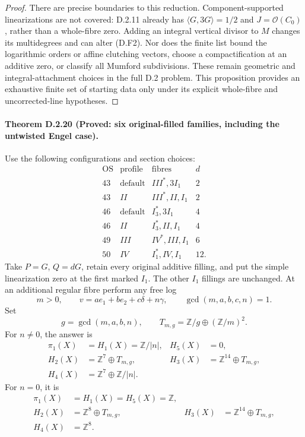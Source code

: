 \begin{proof}
There are precise boundaries to this reduction.
Component-supported linearizations are not covered:
D.2.11 already has $\langle G,3G\rangle=1/2$ and
$J=\mathcal O(C_0)$, rather than a whole-fibre zero.
Adding an integral vertical divisor to $M$ changes its
multidegrees and can alter (D.F2).
Nor does the finite list bound the logarithmic orders
or affine clutching vectors, choose a compactification
at an additive zero, or classify all Mumford subdivisions.
These remain geometric and integral-attachment choices
in the full D.2 problem. This proposition provides an
exhaustive finite set of starting data only under its
explicit whole-fibre and uncorrected-line hypotheses.
\end{proof}

\paragraph{Theorem D.2.20 (Proved: six original-filled families, including the untwisted Engel case).}
Use the following configurations and section choices:
\[
\begin{array}{c|c|l|r}
 \mathrm{OS}&\mathrm{profile}&\text{fibres}&d\\\hline
 43&\mathrm{default}&III^*,3I_1&2\\
 43&II&III^*,II,I_1&2\\
 46&\mathrm{default}&I_3^*,3I_1&4\\
 46&II&I_3^*,II,I_1&4\\
 49&III&IV^*,III,I_1&6\\
 50&IV&I_1^*,IV,I_1&12.
\end{array}
\]
Take $P=G$, $Q=dG$, retain every original additive filling,
and put the simple linearization zero at the first marked
$I_1$. The other $I_1$ fillings are unchanged. At an
additional regular fibre perform any free log
\[
 m>0,\qquad v=a e_1+b e_2+c\delta+n\gamma,
 \qquad\gcd(m,a,b,c,n)=1.
\]
Set
\[
        g=\gcd(m,a,b,n),\qquad
        T_{m,g}=\mathbb Z/g\oplus(\mathbb Z/m)^2.
\]
For $n\ne0$, the answer is
\[
\begin{aligned}
 \pi_1(X)&=H_1(X)=\mathbb Z/|n|, &H_5(X)&=0,\\
 H_2(X)&=\mathbb Z^7\oplus T_{m,g},
 &H_3(X)&=\mathbb Z^{14}\oplus T_{m,g},\\
 H_4(X)&=\mathbb Z^7\oplus\mathbb Z/|n|.
\end{aligned}
\tag{D.O1}
\]
For $n=0$, it is
\[
\begin{aligned}
 \pi_1(X)&=H_1(X)=H_5(X)=\mathbb Z,\\
 H_2(X)&=\mathbb Z^8\oplus T_{m,g},
 &H_3(X)&=\mathbb Z^{14}\oplus T_{m,g},\\
 H_4(X)&=\mathbb Z^8.
\end{aligned}
\tag{D.O2}
\]
